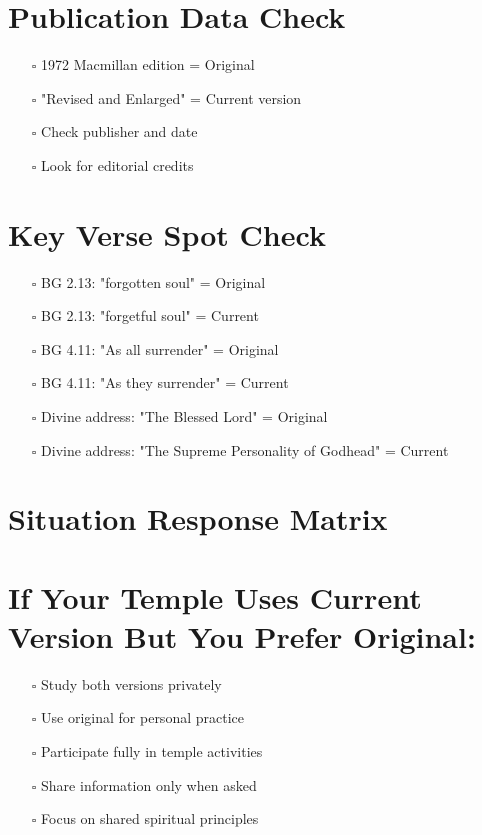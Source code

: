 \documentclass[11pt,twoside]{book}
\begin{document}
\section*{Publication Data Check}
\label{sec:org6413369}
\begin{itemize}
\item[{$\square$}] 1972 Macmillan edition = Original
\item[{$\square$}] "Revised and Enlarged" = Current version
\item[{$\square$}] Check publisher and date
\item[{$\square$}] Look for editorial credits
\end{itemize}
\section*{Key Verse Spot Check}
\label{sec:org8a8ee14}
\begin{itemize}
\item[{$\square$}] BG 2.13: "forgotten soul" = Original
\item[{$\square$}] BG 2.13: "forgetful soul" = Current
\item[{$\square$}] BG 4.11: "As all surrender" = Original
\item[{$\square$}] BG 4.11: "As they surrender" = Current
\item[{$\square$}] Divine address: "The Blessed Lord" = Original
\item[{$\square$}] Divine address: "The Supreme Personality of Godhead" = Current
\end{itemize}
\section*{Situation Response Matrix}
\label{sec:org9a9a5d9}

\section*{If Your Temple Uses Current Version But You Prefer Original:}
\label{sec:org3f588da}
\begin{itemize}
\item[{$\square$}] Study both versions privately
\item[{$\square$}] Use original for personal practice
\item[{$\square$}] Participate fully in temple activities
\item[{$\square$}] Share information only when asked
\item[{$\square$}] Focus on shared spiritual principles
\end{itemize}
\end{document}
